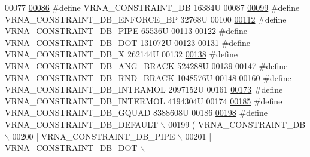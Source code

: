 \begin{DoxyCode}
00077 
\hypertarget{constraints__hard_8h_source_l00086}{}\hyperlink{group__hard__constraints_ga4bfc2f15c4f261c62a11af9d2aa80c90}{00086} \textcolor{preprocessor}{#define VRNA\_CONSTRAINT\_DB                16384U}
00087 
\hypertarget{constraints__hard_8h_source_l00099}{}\hyperlink{group__hard__constraints_ga29ebe940110d60ab798fdacbcdbbfb7d}{00099} \textcolor{preprocessor}{#define VRNA\_CONSTRAINT\_DB\_ENFORCE\_BP           32768U}
00100 
\hypertarget{constraints__hard_8h_source_l00112}{}\hyperlink{group__hard__constraints_ga13053547a2de5532b64b64d35e097ae1}{00112} \textcolor{preprocessor}{#define VRNA\_CONSTRAINT\_DB\_PIPE              65536U}
00113 
\hypertarget{constraints__hard_8h_source_l00122}{}\hyperlink{group__hard__constraints_ga369bea82eae75fbe626f409fa425747e}{00122} \textcolor{preprocessor}{#define VRNA\_CONSTRAINT\_DB\_DOT               131072U}
00123 
\hypertarget{constraints__hard_8h_source_l00131}{}\hyperlink{group__hard__constraints_ga7283bbe0f8954f7b030ecc3f2d1932b2}{00131} \textcolor{preprocessor}{#define VRNA\_CONSTRAINT\_DB\_X                 262144U}
00132 
\hypertarget{constraints__hard_8h_source_l00138}{}\hyperlink{constraints__hard_8h_ad54c1315a47d55653dcaa5de6e544b77}{00138} \textcolor{preprocessor}{#define VRNA\_CONSTRAINT\_DB\_ANG\_BRACK         524288U}
00139 
\hypertarget{constraints__hard_8h_source_l00147}{}\hyperlink{group__hard__constraints_gac17b034852c914bc5879954c65d7e74b}{00147} \textcolor{preprocessor}{#define VRNA\_CONSTRAINT\_DB\_RND\_BRACK         1048576U}
00148 
\hypertarget{constraints__hard_8h_source_l00160}{}\hyperlink{group__hard__constraints_ga5c17253f5a39d1d49b0fb11f5196982a}{00160} \textcolor{preprocessor}{#define VRNA\_CONSTRAINT\_DB\_INTRAMOL    2097152U}
00161 
\hypertarget{constraints__hard_8h_source_l00173}{}\hyperlink{group__hard__constraints_ga31d0ebb9755ca8a4acafc14f00ca755d}{00173} \textcolor{preprocessor}{#define VRNA\_CONSTRAINT\_DB\_INTERMOL    4194304U}
00174 
\hypertarget{constraints__hard_8h_source_l00185}{}\hyperlink{group__hard__constraints_ga75cfab03cdc97c95b3ce8bb29f52b08e}{00185} \textcolor{preprocessor}{#define VRNA\_CONSTRAINT\_DB\_GQUAD                8388608U}
00186 
\hypertarget{constraints__hard_8h_source_l00198}{}\hyperlink{group__hard__constraints_ga1c3864bdc92147a4d93de2b1b4356177}{00198} \textcolor{preprocessor}{#define VRNA\_CONSTRAINT\_DB\_DEFAULT \(\backslash\)}
00199 \textcolor{preprocessor}{    (   VRNA\_CONSTRAINT\_DB \(\backslash\)}
00200 \textcolor{preprocessor}{      | VRNA\_CONSTRAINT\_DB\_PIPE \(\backslash\)}
00201 \textcolor{preprocessor}{      | VRNA\_CONSTRAINT\_DB\_DOT \(\backslash\)}

\end{DoxyCode}
